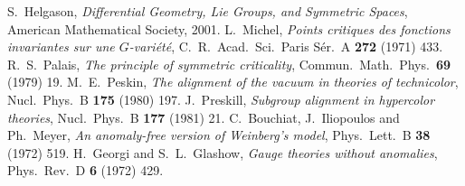  S.~Helgason, \emph{Differential Geometry, Lie Groups, and Symmetric Spaces}, American Mathematical Society, 2001.
 L.~Michel, \emph{Points critiques des fonctions invariantes sur une $G$-vari\'et\'e}, C.~R.~Acad.~Sci.~Paris S\'er.~A \textbf{272} (1971) 433.
 R.~S.~Palais, \emph{The principle of symmetric criticality}, Commun.~Math.~Phys.~\textbf{69} (1979) 19.
 M.~E.~Peskin, \emph{The alignment of the vacuum in theories of technicolor}, Nucl.~Phys.~B \textbf{175} (1980) 197.
 J.~Preskill, \emph{Subgroup alignment in hypercolor theories}, Nucl.~Phys.~B \textbf{177} (1981) 21.
 C.~Bouchiat, J.~Iliopoulos and Ph.~Meyer, \emph{An anomaly-free version of Weinberg's model}, Phys.~Lett.~B \textbf{38} (1972) 519.
 H.~Georgi and S.~L.~Glashow, \emph{Gauge theories without anomalies}, Phys.~Rev.~D \textbf{6} (1972) 429.
